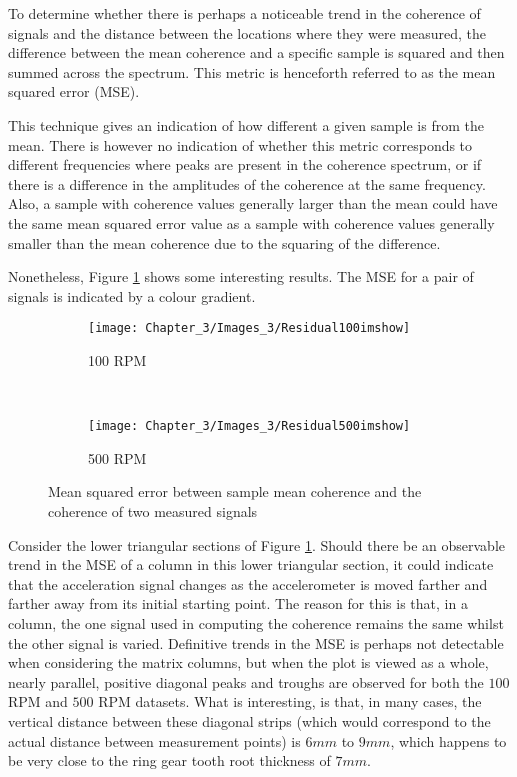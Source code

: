 To determine whether there is perhaps a noticeable trend in the coherence of signals and the distance between the locations where they were measured, the difference between the mean coherence and a specific sample is squared and then summed across the spectrum. This metric is henceforth referred to as the mean squared error (MSE). 


This technique gives an indication of how different a given sample is from the mean. There is however no indication of whether this metric corresponds to different frequencies where peaks are present in the coherence spectrum, or if there is a difference in the amplitudes of the coherence at the same frequency. Also, a sample with coherence values generally larger than the mean could have the same mean squared error value as a sample with coherence values generally smaller than the mean coherence due to the squaring of the difference. 

Nonetheless, Figure \ref{F:Coherence_compare} shows some interesting results. The MSE for a pair of signals is indicated by a colour gradient.

\begin{figure}[H]
	\centering
	\begin{subfigure}{0.49\textwidth}
		\texttt{[image: Chapter\_3/Images\_3/Residual100imshow]}
		\caption{100 RPM}
	\end{subfigure}
	~
	\begin{subfigure}{0.49\textwidth}
		\texttt{[image: Chapter\_3/Images\_3/Residual500imshow]}
		\caption{500 RPM}
	\end{subfigure}
	
	\caption{Mean squared error between sample mean coherence and the coherence of two measured signals}
	\label{F:Coherence_compare}
\end{figure}

Consider the lower triangular sections of Figure \ref{F:Coherence_compare}. Should there be an observable trend in the MSE of a column in this lower triangular section, it could indicate that the acceleration signal changes as the accelerometer is moved farther and farther away from its initial starting point. The reason for this is that, in a column, the one signal used in computing the coherence remains the same whilst the other signal is varied. Definitive trends in the MSE is perhaps not detectable when considering the matrix columns, but when the plot is viewed as a whole, nearly parallel, positive diagonal peaks and troughs are observed for both the $100$ RPM and $500$ RPM datasets. What is interesting, is that, in many cases, the vertical distance between these diagonal strips  (which would correspond to the actual distance between measurement points) is $6mm$ to $9mm$, which happens to be very close to the ring gear tooth root thickness of $7mm$. 

